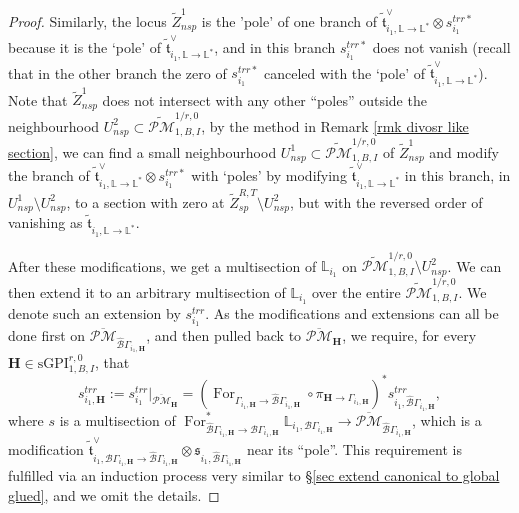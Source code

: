 \documentclass[11pt]{amsart}
\theoremstyle{definition}
\theoremstyle{remark}
\newcommand{\oPMb}{{\overline{\mathcal{PM}}}}
\newcommand{\nontilde}{}
\newcommand{\<}{\left<}
\renewcommand{\>}{\right>}
\numberwithin{equation}{section}
\def\sGPI{\text{sGPI}}
\begin{document}
\begin{proof}
         Similarly, the locus $\widetilde{Z}^{1}_{nsp}$ is the 'pole' of one branch of $\tilde{\mathfrak{t}}^{\vee}_{i_1,\mathbb L \to \mathbb L^*}\otimes \nontilde{s}^{trr*}_{i_1}$ because it is the `pole' of $\tilde{\mathfrak{t}}^{\vee}_{i_1,\mathbb L \to \mathbb L^*}$, and in this branch $\nontilde{s}^{trr*}_{i_1}$ does not vanish (recall that in the other branch the zero of $\nontilde{s}^{trr*}_{i_1}$ canceled with the `pole' of $\tilde{\mathfrak{t}}^{\vee}_{i_1,\mathbb L \to \mathbb L^*}$). 
         Note that $\widetilde{Z}^{1}_{nsp}$ does not intersect with any %
other ``poles'' outside %
the neighbourhood $U^2_{nsp}\subset \widetilde{\mathcal{PM}}^{1/r,0}_{1,B,I}$,  by the method in Remark \ref{rmk divosr like section}, we can find a small neighbourhood $U^{1}_{nsp}\subset \widetilde{\mathcal{PM}}^{1/r,0}_{1,B,I}$ of $\widetilde{Z}^{1}_{nsp}$ and modify the branch of $\tilde{\mathfrak{t}}^{\vee}_{i_1,\mathbb L \to \mathbb L^*}\otimes \nontilde{s}^{trr*}_{i_1}$ with `poles' by modifying $\tilde{\mathfrak{t}}^{\vee}_{i_1,\mathbb L \to \mathbb L^*}$ in this branch, in $U^{1}_{nsp}\setminus U^{2}_{nsp}$, to a section with zero at $\widetilde{Z}^{R,T}_{sp}\setminus U^{2}_{nsp}$, but with the reversed order of vanishing as $\tilde{\mathfrak{t}}_{i_1,\mathbb L \to \mathbb L^*}$.

         After these modifications, we get a multisection of $\mathbb L_{i_1}$ on $\widetilde{\mathcal{PM}}^{1/r,0}_{1,B,I}\setminus U^{2}_{nsp}$. We can then extend it to an arbitrary multisection of $\mathbb L_{i_1}$ over the entire  $\widetilde{\mathcal{PM}}^{1/r,0}_{1,B,I}$.   We denote such an extension by $s_{i_1}^{trr}$. 
         As the modifications and extensions can all be done first on $\oPMb_{\hat{\mathcal{B}}\Gamma_{i_1,\bm{H}}}$, and then pulled back to  $\oPMb_{\bm{H}}$, we require, for every $\bm{H}\in \sGPI_{1,B,I}^{r,0}$, that 
         $$s_{i_1,\bm{H}}^{trr}:=s_{i_1}^{trr}\vert_{\oPMb_{\bm{H}}}=\left(\operatorname{For}_{\Gamma_{i_1,\bm{H}} \to \hat{\mathcal B}\Gamma_{i_1,\bm{H}}}\circ\pi_{\bm{H}\to \Gamma_{i_1,\bm{H}}}\right)^* s_{i_1,\hat{\mathcal B}\Gamma_{i_1,\bm{H}}}^{trr},$$
             where $s$ is a multisection of $\operatorname{For}^*_{\hat{\mathcal B}\Gamma_{i_1,\bm{H}} \to {\mathcal B}\Gamma_{i_1,\bm{H}}}\mathbb L_{i_1,{\mathcal B}\Gamma_{i_1,\bm{H}}}\to \oPMb_{\hat{\mathcal{B}}\Gamma_{i_1,\bm{H}}}$, which is a modification $        \tilde{\mathfrak t}^\vee_{i_1,{\mathcal B}\Gamma_{i_1,\bm{H}}\to\hat{\mathcal B}\Gamma_{i_1,\bm{H}}}\otimes \mathfrak s_{i_1,\hat{\mathcal B}\Gamma_{i_1,\bm{H}}}$ near its ``pole''.  
             This requirement is fulfilled via an induction process very similar to \S \ref{sec extend canonical to global glued}, and we omit the details. 
        

\end{proof}
\end{document}
